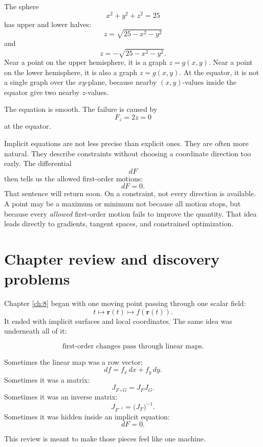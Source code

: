 \begin{example}
The sphere
\[
    x^2+y^2+z^2=25
\]
has upper and lower halves:
\[
    z=\sqrt{25-x^2-y^2}
\]
and
\[
    z=-\sqrt{25-x^2-y^2}.
\]
Near a point on the upper hemisphere, it is a graph \(z=g(x,y)\).  Near a point on
the lower hemisphere, it is also a graph \(z=g(x,y)\).  At the equator, it is not a
single graph over the \(xy\)-plane, because nearby \((x,y)\)-values inside the equator
give two nearby \(z\)-values.

The equation is smooth.  The failure is caused by
\[
    F_z=2z=0
\]
at the equator.
\end{example}

Implicit equations are not less precise than explicit ones.  They are often more natural.
They describe constraints without choosing a coordinate direction too early.  The
differential
\[
    dF
\]
then tells us the allowed first-order motions:
\[
    dF=0.
\]
That sentence will return soon.  On a constraint, not every direction is available.
A point may be a maximum or minimum not because all motion stops, but because every
\emph{allowed} first-order motion fails to improve the quantity.  That idea leads directly
to gradients, tangent spaces, and constrained optimization.

\section{Chapter review and discovery problems}
\label{sec:8.7}

Chapter \ref{ch:8} began with one moving point passing through one scalar field:
\[
    t\longmapsto \mathbf r(t)\longmapsto f(\mathbf r(t)).
\]
It ended with implicit surfaces and local coordinates.  The same idea was underneath
all of it:

\[
    \text{first-order changes pass through linear maps.}
\]

Sometimes the linear map was a row vector:
\[
    df=f_x\,dx+f_y\,dy.
\]
Sometimes it was a matrix:
\[
    J_{F\circ G}=J_FJ_G.
\]
Sometimes it was an inverse matrix:
\[
    J_{F^{-1}}=\bigl(J_F\bigr)^{-1}.
\]
Sometimes it was hidden inside an implicit equation:
\[
    dF=0.
\]

This review is meant to make those pieces feel like one machine.

